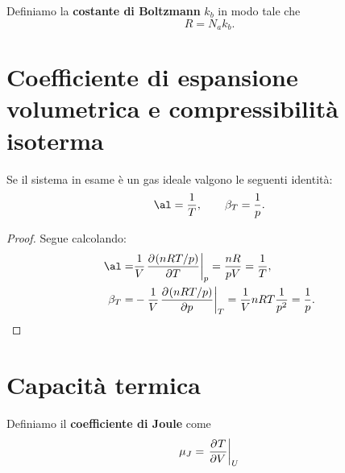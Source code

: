 \begin{definition}
Definiamo la \textbf{costante di Boltzmann} $k_b$ in modo tale che 
\[R=N_a k_b.\]
\end{definition}

\section{Coefficiente di espansione volumetrica e compressibilit\`a isoterma}

\begin{proposition}\label{CoefficienteEspansioneECompressibilitaIsotermaPerGasIdeali}
Se il sistema in esame \`e un gas ideale valgono le seguenti identit\`a:
\[\al=\frac 1T,\qquad \beta_T=\frac 1p.\]
\end{proposition}
\begin{proof}
Segue calcolando:
\begin{align*}
\al=&\frac1V\ppb T{(nRT/p)}p=\frac{nR}{pV}=\frac1T,\\
\beta_T=&-\frac1V\ppb p{(nRT/p)}T=\frac1V nRT\frac1{p^2}=\frac1p.
\end{align*}
\end{proof}

\section{Capacit\`a termica}

\begin{definition}
Definiamo il \textbf{coefficiente di Joule} come
\[\mu_J=\ppb VTU\]
\end{definition}

